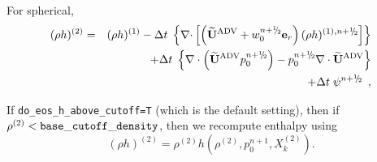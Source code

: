 \begin{description}
\begin{enumerate}
\begin{enumerate}
\begin{description}
\item For spherical,
\begin{eqnarray}
(\rho h)^{(2)} &=& (\rho h)^{(1)} - \dt \; \left\{ \nablab \cdotb \left[ \left(\uadvtwo+w_0^{\nph} \er\right)  
(\rho h)^{(1),\nph} \right] \right\} \nonumber \\
    && + \dt \; \left \{ \nabla \cdot \left (\uadvtwo p_0^{\nph} \right ) 
       - p_0^{\nph} \nabla \cdot \uadvtwo \right \} \nonumber \\
    && + \dt \; \psi^{\nph} \enskip ,
\end{eqnarray}

\end{description}

\end{enumerate}

If {\tt do\_eos\_h\_above\_cutoff=T} (which is the default setting), then if
$\rho^{(2)} < {\tt base\_cutoff\_density}$, then we recompute enthalpy using
\begin{equation}
(\rho h)^{(2)} = \rho^{(2)}h\left(\rho^{(2)},p_0^{n+1},X_k^{(2)}\right).
\end{equation}


\end{enumerate}
\end{description}
